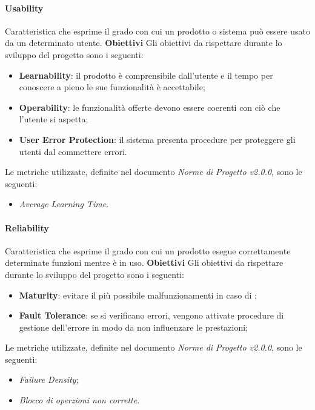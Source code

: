 \paragraph{Usability} \Spazio
	Caratteristica che esprime il grado con cui un prodotto o sistema può essere usato da un determinato utente.\Spazio
	\textbf{Obiettivi} \Spazio
	Gli obiettivi da rispettare durante lo sviluppo del progetto sono i seguenti:
	\begin{itemize}
		\item{\textbf{Learnability}: il prodotto è comprensibile dall'utente e il tempo per conoscere a pieno le sue funzionalità è accettabile; 
		}
		\item{\textbf{Operability}: le funzionalità offerte devono essere coerenti con ciò che l'utente si aspetta;
		}
		\item{\textbf{User Error Protection}: il sistema presenta procedure per proteggere gli utenti dal commettere errori.
		}
	\end{itemize}
	Le metriche utilizzate, definite nel documento \emph{Norme di Progetto v2.0.0}, sono le seguenti:
	\begin{itemize}
		\item{\emph{Average Learning Time}.}
	\end{itemize}

\paragraph{Reliability} \Spazio
	Caratteristica che esprime il grado con cui un prodotto esegue correttamente determinate funzioni  mentre è in uso.\Spazio
	\textbf{Obiettivi} \Spazio
	Gli obiettivi da rispettare durante lo sviluppo del progetto sono i seguenti:
	\begin{itemize}
		\item{\textbf{Maturity}: evitare il più possibile malfunzionamenti in caso di ;
		}
		\item{\textbf{Fault Tolerance}: se si verificano errori, vengono attivate procedure di gestione dell'errore in modo da non influenzare le prestazioni;
		}
	\end{itemize}
	Le metriche utilizzate, definite nel documento \emph{Norme di Progetto v2.0.0}, sono le seguenti:
	\begin{itemize}
		\item{\emph{Failure Density};}
		\item{\emph{Blocco di operzioni non corrette}.}
	\end{itemize}	

